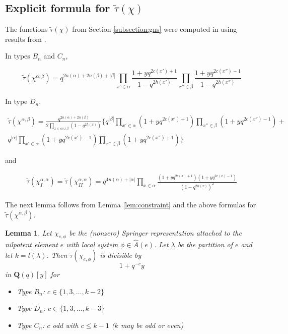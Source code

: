 \documentclass[10pt]{amsart}
\newcommand{\qq}{\mathbf Q}
\newcommand{\ar}{{\hat{A}}(e)}
\newcommand{\rep}{\chi^{\alpha, \beta}}
\newcommand{\ttau}{\tilde{\tau}}
\theoremstyle{plain}
\newtheorem{lemma}[theorem]{Lemma}
\theoremstyle{definition}
\theoremstyle{remark}
\begin{document}
\subsection{\texorpdfstring{Explicit formula for $\ttau(\chi)$}{Explicit formula for chi}}

The functions $\ttau(\chi)$ from Section \ref{subsection:gns} were computed in \cite{gyoja:invariants1} using results from \cite{macdonald:book}.

In types $B_n$ and $C_n$,

\begin{equation}  \label{GNS_BC}
\ttau(\rep) =   q^{2n(\alpha) + 2n(\beta) + |\beta|} 
\prod_{x' \in \alpha}  \frac{1 + yq^{2c(x')+1}}{1 - q^{2h(x')}}
\prod_{x'' \in \beta}  \frac{1 + yq^{2c(x'')-1}}{1 - q^{2h(x'')}}
\end{equation}

In type $D_n$,

\begin{eqnarray} \label{GNS_D}
\ttau(\rep) =   \frac{q^{2n(\alpha) + 2n(\beta)}} {2 \prod_{x \in \alpha \cup \beta} (1 - q^{2h(x)} )} 
\lbrace
q^{|\beta|} \prod_{x' \in \alpha}  (1 + yq^{2c(x')+1})
\prod_{x'' \in \beta}  (1 + yq^{2c(x'')-1}) + \\ \nonumber
q^{|\alpha|} \prod_{x' \in \alpha}  (1 + yq^{2c(x')-1})
\prod_{x'' \in \beta}  (1 + yq^{2c(x'')+1}) 
\rbrace
\end{eqnarray}

and

\begin{eqnarray}
\ttau(\chi^{\alpha,\alpha}_I) =  
\ttau(\chi^{\alpha,\alpha}_{II}) =  
 q^{4n(\alpha) +|\alpha|}
\prod_{x \in \alpha}
\frac{
(1 + yq^{2c(x)+1}) (1 + yq^{2c(x)-1})
}
{
(1 - q^{2h(x)})^2
}
\end{eqnarray}

\medskip

The next lemma follows from Lemma \ref{lem:constraint} and the above formulas for $\ttau(\rep)$.

\begin{lemma}  \label{cor:divisors}
Let $\chi_{e, \phi}$ be the (nonzero) 
Springer representation attached to the nilpotent element $e$ with local system $\phi \in \ar$. 
Let $\lambda$ be the partition of $e$ and let $k = l(\lambda)$. %
Then 
$\ttau(\chi_{e, \phi})$ is divisible by 
$$1+q^{-c}y$$ 
in $\qq(q)[y]$ for 
\begin{itemize} 
\item Type $B_n$: $c \in \{ 1, 3, \dots, k-2 \}$
\item Type $D_n$: $c \in \{1, 3, \dots, k-3 \}$ 
\item Type $C_n$: $c$ odd with $c  \leq k-1$  ($k$ may be odd or even)
\end{itemize} 
\end{lemma}
\end{document}
